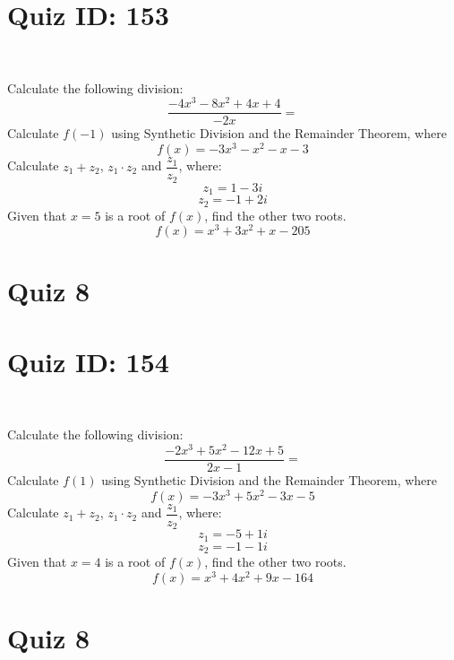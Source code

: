 \documentclass{exam}
\begin{document}
\section*{Quiz ID: 153}
\vspace{0.5cm}\
\vspace{1cm}\
\begin{questions}
\question Calculate the following division:\[\dfrac{
-4x^3 - 8x^2 + 4x + 4}{
-2x}=\] \makeemptybox{\stretch{2}}
\question Calculate $f(-1)$ using Synthetic Division and the Remainder Theorem, where\[f(x) = 
-3x^3 - x^2 - x - 3\]
\newpage\question Calculate $z_1+z_2$, $z_1\cdot z_2$ and $\dfrac{z_1}{z_2}$, where:\[z_1=1-3\mathit{i}\]\[z_2=-1+2\mathit{i}\]
\question Given that $x=5$ is a root of $f(x)$, find the other two roots.\[f(x)=
x^3 + 3x^2 + x - 205\]\makeemptybox{\stretch{1}}
\end{questions}\newpage
\newpage
\section*{Quiz 8}
\section*{Quiz ID: 154}
\vspace{0.5cm}\
\vspace{1cm}\
\begin{questions}
\question Calculate the following division:\[\dfrac{
-2x^3 + 5x^2 - 12x + 5}{
2x - 1}=\] 
\question Calculate $f(1)$ using Synthetic Division and the Remainder Theorem, where\[f(x) = 
-3x^3 + 5x^2 - 3x - 5\]
\newpage\question Calculate $z_1+z_2$, $z_1\cdot z_2$ and $\dfrac{z_1}{z_2}$, where:\[z_1=-5+1\mathit{i}\]\[z_2=-1-1\mathit{i}\]\makeemptybox{\stretch{1}}
\question Given that $x=4$ is a root of $f(x)$, find the other two roots.\[f(x)=
x^3 + 4x^2 + 9x - 164\]\makeemptybox{\stretch{1}}
\end{questions}\newpage
\newpage
\section*{Quiz 8}
\end{document}
